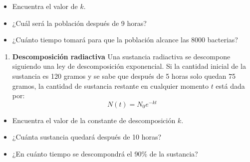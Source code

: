 \documentclass[
]{article}
\providecommand{\tightlist}{%
  \setlength{\itemsep}{0pt}\setlength{\parskip}{0pt}}\usepackage{longtable,booktabs,array}
\begin{document}
\begin{itemize}
\item
  Encuentra el valor de \(k\).
\item
  ¿Cuál será la población después de 9 horas?
\item
  ¿Cuánto tiempo tomará para que la población alcance las 8000
  bacterias?
\end{itemize}

\begin{enumerate}
\def\labelenumi{\arabic{enumi}.}
\setcounter{enumi}{10}
\tightlist
\item
  \textbf{Descomposición radiactiva} Una sustancia radiactiva se
  descompone siguiendo una ley de descomposición exponencial. Si la
  cantidad inicial de la sustancia es 120 gramos y se sabe que después
  de 5 horas solo quedan 75 gramos, la cantidad de sustancia restante en
  cualquier momento \(t\) está dada por: \[ N(t) = N_0 e^{-kt} \]
\end{enumerate}

\begin{itemize}
\item
  Encuentra el valor de la constante de descomposición \(k\).
\item
  ¿Cuánta sustancia quedará después de 10 horas?
\item
  ¿En cuánto tiempo se descompondrá el 90\% de la sustancia?
\end{itemize}
\end{document}
